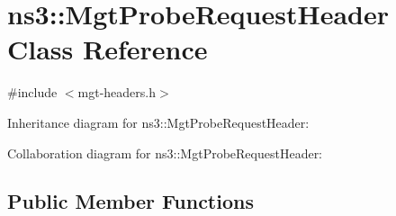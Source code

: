 \hypertarget{classns3_1_1MgtProbeRequestHeader}{}\section{ns3\+:\+:Mgt\+Probe\+Request\+Header Class Reference}
\label{classns3_1_1MgtProbeRequestHeader}


{\ttfamily \#include $<$mgt-\/headers.\+h$>$}



Inheritance diagram for ns3\+:\+:Mgt\+Probe\+Request\+Header\+:


Collaboration diagram for ns3\+:\+:Mgt\+Probe\+Request\+Header\+:
\subsection*{Public Member Functions}
